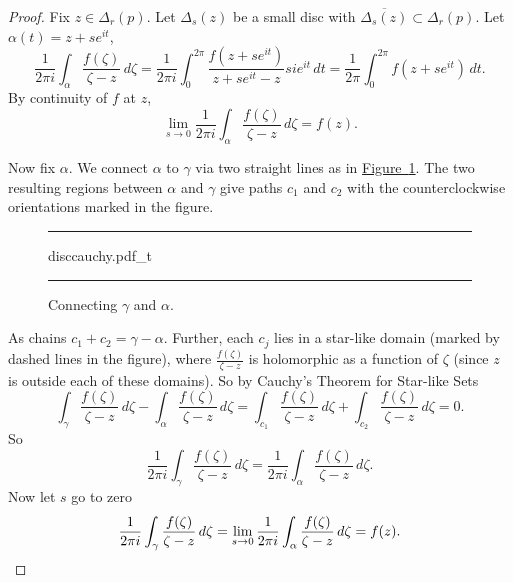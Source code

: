 \documentclass[12pt,openany]{book}
\theoremstyle{plain}
\theoremstyle{remark}
\theoremstyle{definition}
\newenvironment{myfig}{%
\begin{figure}[h!t]
\noindent\rule{\textwidth}{0.4pt}\vspace{12pt}\par\centering}%
{\par\noindent\rule{\textwidth}{0.4pt}
\end{figure}}
\theoremstyle{exercise}
\theoremstyle{example}
\newcommand{\figureref}[1]{\hyperref[#1]{Figure~\ref*{#1}}}
\begin{document}
\begin{proof}
Fix $z \in \Delta_r(p)$.
Let $\Delta_s(z)$ be a small disc with $\overline{\Delta_s(z)} \subset
\Delta_r(p)$.
Let $\alpha(t) = z+s e^{i t}$,
\begin{equation*}
\frac{1}{2\pi i}
\int_{\alpha}
\frac{f(\zeta)}{\zeta-z}
\,
d \zeta
=
\frac{1}{2\pi i}
\int_0^{2\pi} \frac{f(z+se^{it})}{z + se^{it} - z} s i e^{it} \, dt
=
\frac{1}{2\pi}
\int_0^{2\pi} f(z+se^{it}) \, dt .
\end{equation*}
By continuity of $f$ at $z$,
\begin{equation*}
\lim_{s \to 0}
\frac{1}{2\pi i}
\int_{\alpha}
\frac{f(\zeta)}{\zeta-z}
\,
d \zeta
=
f(z) .
\end{equation*}

Now fix $\alpha$.
We connect $\alpha$ to $\gamma$
via two straight lines as in \figureref{fig:disccauchy}.
The two resulting regions between $\alpha$ and $\gamma$
give paths $c_1$ and $c_2$ with the counterclockwise
orientations marked in the figure.
\begin{myfig}
{disccauchy.pdf_t}
\caption{Connecting $\gamma$ and $\alpha$.%
\label{fig:disccauchy}}
\end{myfig}

As chains $c_1+c_2 = \gamma - \alpha$.  Further, each
$c_j$ lies in a star-like domain (marked by dashed lines in the figure),
where $\frac{f(\zeta)}{\zeta-z}$ is holomorphic
as a function of $\zeta$ (since $z$ is outside each of these domains).
So by Cauchy's Theorem for Star-like Sets
\begin{equation*}
\int_{\gamma} \frac{f(\zeta)}{\zeta-z} \, d\zeta -
\int_{\alpha} \frac{f(\zeta)}{\zeta-z} \, d\zeta =
\int_{c_1} \frac{f(\zeta)}{\zeta-z} \, d\zeta + 
\int_{c_2} \frac{f(\zeta)}{\zeta-z} \, d\zeta = 0 .
\end{equation*}
So
\begin{equation*}
\frac{1}{2\pi i}
\int_{\gamma} \frac{f(\zeta)}{\zeta-z} \, d\zeta =
\frac{1}{2\pi i}
\int_{\alpha} \frac{f(\zeta)}{\zeta-z} \, d\zeta .
\end{equation*}
Now let $s$ go to zero
\begin{equation*}
\frac{1}{2\pi i}
\int_{\gamma} \frac{f(\zeta)}{\zeta-z} \, d\zeta =
\lim_{s \to 0}
\frac{1}{2\pi i}
\int_{\alpha} \frac{f(\zeta)}{\zeta-z} \, d\zeta 
= f(z) .  \qedhere
\end{equation*}
\end{proof}
\end{document}
